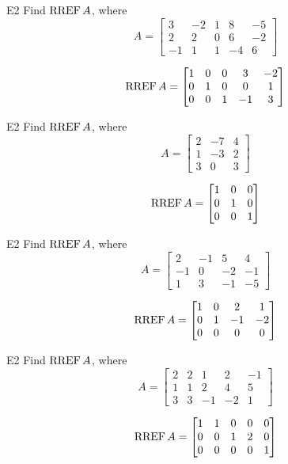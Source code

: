\begin{problem}{E2}
Find \(\operatorname{RREF} A\), where
\[
  A =
  \begin{bmatrix}
    3 & -2 & 1 & 8 & -5 \\
    2 & 2 & 0 & 6 & -2 \\
    -1 & 1 & 1 & -4 & 6
  \end{bmatrix}
\]
\end{problem}
\begin{solution}
\[
  \operatorname{RREF} A =
  \begin{bmatrix}
    1 & 0 & 0 & 3 & -2 \\
    0 & 1 & 0 & 0 & 1 \\
    0 & 0 & 1 & -1 & 3
  \end{bmatrix}
\]
\end{solution}

\begin{problem}{E2}
Find \(\operatorname{RREF} A\), where
\[
  A =
  \begin{bmatrix}
    2 & -7 & 4 \\
    1 & -3 & 2 \\
    3 & 0 & 3
  \end{bmatrix}
\]
\end{problem}
\begin{solution}
\[
  \operatorname{RREF} A =
  \begin{bmatrix}
    1 & 0 & 0 \\
    0 & 1 & 0 \\
    0 & 0 & 1
  \end{bmatrix}
\]
\end{solution}

\begin{problem}{E2}
Find \(\operatorname{RREF} A\), where
\[
  A =
  \begin{bmatrix}
    2 & -1 & 5 & 4 \\
    -1 & 0 & -2 & -1 \\
    1 & 3 & -1 & -5
  \end{bmatrix}
\]
\end{problem}
\begin{solution}
\[
  \operatorname{RREF} A =
  \begin{bmatrix}
    1 & 0 & 2 & 1 \\
    0 & 1 & -1 & -2 \\
    0 & 0 & 0 & 0
  \end{bmatrix}
\]
\end{solution}

\begin{problem}{E2}
Find \(\operatorname{RREF} A\), where
\[
  A =
  \begin{bmatrix}
    2 & 2 & 1 & 2 & -1 \\
    1 & 1 & 2 & 4 & 5 \\
    3 & 3 & -1 & -2 & 1
  \end{bmatrix}
\]
\end{problem}
\begin{solution}
\[
  \operatorname{RREF} A =
  \begin{bmatrix}
    1 & 1 & 0 & 0 & 0 \\
    0 & 0 & 1 & 2 & 0 \\
    0 & 0 & 0 & 0 & 1
  \end{bmatrix}
\]
\end{solution}
